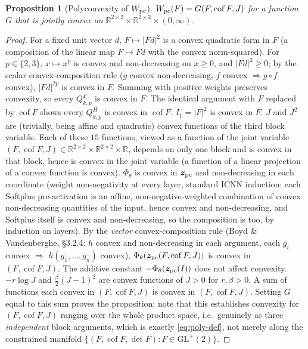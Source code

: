 \documentclass[10pt,a4paper]{article}
\newtheorem{proposition}{Proposition}
\newcommand{\Cof}{\operatorname{cof}}
\newcommand{\R}{\mathbb{R}}
\newcommand{\GLp}{\mathrm{GL}^+(2)}
\begin{document}
\begin{proposition}[Polyconvexity of $W_{\rm pc}$]
\label{prop:polyconvex}
$W_{\rm pc}(F)=G(F,\Cof F,J)$ for a function $G$ that is jointly convex
on $\R^{2\times2}\times\R^{2\times2}\times(0,\infty)$.
\end{proposition}
\begin{proof}
For a fixed unit vector $d$, $F\mapsto|Fd|^2$ is a convex quadratic form
in $F$ (a composition of the linear map $F\mapsto Fd$ with the convex
norm-squared). For $p\in\{2,3\}$, $x\mapsto x^p$ is convex and
non-decreasing on $x\geq0$, and $|Fd|^2\geq0$; by the scalar
convex-composition rule ($g$ convex non-decreasing, $f$ convex
$\Rightarrow g\circ f$ convex), $|Fd|^{2p}$ is convex in $F$. Summing
with positive weights preserves convexity, so every $Q_{k,p}^F$ is convex
in $F$. The identical argument with $F$ replaced by $\Cof F$ shows every
$Q_{k,p}^H$ is convex in $\Cof F$. $I_1=|F|^2$ is convex in $F$. $J$ and
$J^2$ are (trivially, being affine and quadratic) convex functions of the
third block variable. Each of these $15$ functions, viewed as a function
of the joint variable $(F,\Cof F,J)\in\R^{2\times2}\times\R^{2\times2}
\times\R$, depends on only one block and is convex in that block, hence
is convex in the joint variable (a function of a linear projection of a
convex function is convex). $\Phi_\theta$ is convex in $\bm z_{\rm pc}$
and non-decreasing in each coordinate (weight non-negativity at every
layer, standard ICNN induction: each Softplus pre-activation is an affine,
non-negative-weighted combination of convex non-decreasing quantities of
the input, hence convex and non-decreasing, and Softplus itself is convex
and non-decreasing, so the composition is too, by induction on layers).
By the \emph{vector} convex-composition rule (Boyd \& Vandenberghe,
\S3.2.4: $h$ convex and non-decreasing in each argument, each $g_i$ convex
$\Rightarrow$ $h(g_1,\dots,g_n)$ convex), $\Phi_\theta(\bm z_{\rm pc}(F,
\Cof F,J))$ is convex in $(F,\Cof F,J)$. The additive constant
$-\Phi_\theta(\bm z_{\rm pc}(I))$ does not affect convexity. $-r\log J$
and $\tfrac\beta2(J-1)^2$ are convex functions of $J>0$ for $r,\beta>0$.
A sum of functions each convex in $(F,\Cof F,J)$ is convex in
$(F,\Cof F,J)$. Setting $G$ equal to this sum proves the proposition;
note that this establishes convexity for $(F,\Cof F,J)$ ranging over the
whole product space, i.e.\ genuinely as three \emph{independent} block
arguments, which is exactly \eqref{eq:poly-def}, not merely along the
constrained manifold $\{(F,\Cof F,\det F):F\in\GLp\}$.
\end{proof}
\end{document}
